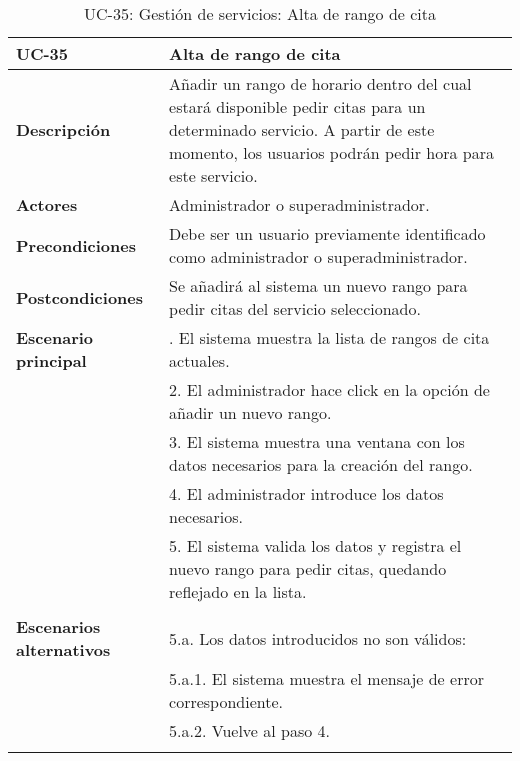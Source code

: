 \begin{table}[H]
  \begin{center}
    \begin{tabularx}{16.4cm}{|l|X|}
      \hline
      \textbf{UC-35} & \textbf{Alta de rango de cita}\\
      \hline
      \textbf{Descripción} & Añadir un rango de horario dentro del cual estará disponible pedir citas para un determinado servicio. A partir de este momento, los usuarios podrán pedir hora para este servicio.\\
      \hline
      \textbf{Actores} & Administrador o superadministrador.\\
      \hline
      \textbf{Precondiciones} & Debe ser un usuario previamente identificado como administrador o superadministrador.\\
      \hline
      \textbf{Postcondiciones} & Se añadirá al sistema un nuevo rango para pedir citas del servicio seleccionado.\\
      \hline
      \textbf{Escenario principal} & \smallskip 1. El sistema muestra la lista de rangos de cita actuales.\\
      & 2. El administrador hace click en la opción de añadir un nuevo rango.\\
      & 3. El sistema muestra una ventana con los datos necesarios para la creación del rango.\\
      & 4. El administrador introduce los datos necesarios.\\
      & 5. El sistema valida los datos y registra el nuevo rango para pedir citas, quedando reflejado en la lista.\\
      & \\
      \hline
      \textbf{Escenarios alternativos} & \smallskip 5.a. Los datos introducidos no son válidos:\\
      & \hspace{0.3cm} 5.a.1. El sistema muestra el mensaje de error correspondiente.\\
      & \hspace{0.3cm} 5.a.2. Vuelve al paso 4.\\
      & \\
      \hline
    \end{tabularx}
    \caption{UC-35: Gestión de servicios: Alta de rango de cita}
  \end{center}
\end{table}


